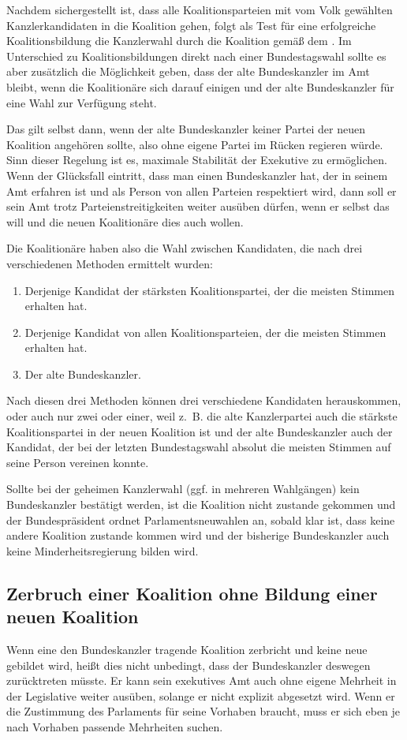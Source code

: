 Nachdem sichergestellt ist, dass alle Koalitionsparteien mit vom Volk gewählten Kanzlerkandidaten in die Koalition gehen, folgt als Test für eine
erfolgreiche Koalitionsbildung die Kanzlerwahl durch die Koalition gemäß dem .
Im Unterschied zu Koalitionsbildungen direkt nach einer Bundestagswahl sollte es aber zusätzlich die Möglichkeit geben, dass
der alte Bundeskanzler im Amt bleibt, wenn die Koalitionäre sich darauf einigen und der alte Bundeskanzler für eine Wahl
zur Verfügung steht.

Das gilt selbst dann, wenn der alte Bundeskanzler keiner Partei der neuen Koalition angehören sollte, also ohne eigene Partei
im Rücken regieren würde.
Sinn dieser Regelung ist es, maximale Stabilität der Exekutive zu ermöglichen.
Wenn der Glücksfall eintritt, dass man einen Bundeskanzler hat, der in seinem Amt erfahren ist und als Person von allen
Parteien respektiert wird, dann soll er sein Amt trotz Parteienstreitigkeiten weiter ausüben dürfen, wenn er selbst das
will und die neuen Koalitionäre dies auch wollen.

Die Koalitionäre haben also die Wahl zwischen Kandidaten, die nach drei verschiedenen Methoden ermittelt wurden:
\begin{enumerate}[label=\alph*)]
  \item Derjenige Kandidat der stärksten Koalitionspartei, der die meisten Stimmen erhalten hat.
  \item Derjenige Kandidat von allen Koalitionsparteien, der die meisten Stimmen erhalten hat.
  \item Der alte Bundeskanzler.
\end{enumerate}

Nach diesen drei Methoden können drei verschiedene Kandidaten herauskommen, oder auch nur zwei oder einer, weil z.~B.
die alte Kanzlerpartei auch die stärkste Koalitionspartei in der neuen Koalition ist und der alte Bundeskanzler auch
der Kandidat, der bei der letzten Bundestagswahl absolut die meisten Stimmen auf seine Person vereinen konnte.

Sollte bei der geheimen Kanzlerwahl (ggf. in mehreren Wahlgängen) kein Bundeskanzler bestätigt werden, ist die Koalition
nicht zustande gekommen und der Bundespräsident ordnet Parlamentsneuwahlen an, sobald klar ist, dass keine andere Koalition
zustande kommen wird und der bisherige Bundeskanzler auch keine Minderheitsregierung bilden wird.

\subsection{Zerbruch einer Koalition ohne Bildung einer neuen Koalition}
Wenn eine den Bundeskanzler tragende Koalition zerbricht und keine neue gebildet wird, heißt dies nicht unbedingt, dass
der Bundeskanzler deswegen zurücktreten müsste.
Er kann sein exekutives Amt auch ohne eigene Mehrheit in der Legislative weiter ausüben, solange er nicht explizit abgesetzt wird.
Wenn er die Zustimmung des Parlaments für seine Vorhaben braucht, muss er sich eben je nach Vorhaben passende Mehrheiten suchen.

